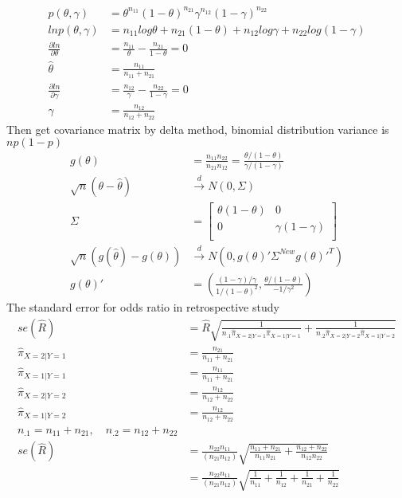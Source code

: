 	\begin{align*}
		p(\theta, \gamma) &= \theta^{n_{11}} (1-\theta)^{n_{21}} \gamma^{n_{12}} (1-\gamma)^{n_{22}}\\
		ln p(\theta, \gamma) &= n_{11}log\theta + n_{21}(1-\theta) + n_{12}log \gamma + n_{22}log(1-\gamma)\\
		\frac{\partial ln}{\partial \theta} &= \frac{n_{11}}{\theta} - \frac{n_{21}}{1-\theta} = 0\\
		\hat{\theta} &= \frac{n_{11}}{n_{11}+ n_{21}}\\
		\frac{\partial ln}{\partial \gamma} &= \frac{n_{12}}{\gamma} - \frac{n_{22}}{1-\gamma} = 0\\
		\hat{\gamma} &= \frac{n_{12}}{n_{12}+ n_{22}}
	\end{align*} 
	Then get covariance matrix by delta method, binomial distribution variance is $np(1-p)$\\
	\begin{align*}
		g(\theta) &= \frac{n_{11}n_{22}}{n_{21}n_{12}} = \frac{\theta/(1-\theta)}{\gamma/(1-\gamma)}\\
		\sqrt{n} \left( \theta - \hat{\theta} \right) & \xrightarrow[]{d} N(0, \Sigma)\\
		\Sigma &= \begin{bmatrix}
			\theta(1-\theta) &  0 \\
			0 &  \gamma(1-\gamma) \\
		\end{bmatrix}\\
		\sqrt{n} \left( g(\hat\theta) - g({\theta}) \right) & \xrightarrow[]{d} N(0, g(\theta)' \Sigma^{New} g(\theta)'^T)\\  
		g(\theta)' &= \left( \frac{(1-\gamma)/\gamma}{1/(1-\theta)^2}, \frac{\theta/(1-\theta)}{-1/\gamma^2} \right)
	\end{align*} 
	The standard error for odds ratio in retrospective study\\
	\begin{align*}
		se(\hat R) &= \hat{R} \sqrt{\frac{1}{n_{.1}\hat{\pi}_{X=2|Y=1}\hat{\pi}_{X=1|Y=1} } + \frac{1}{n_{.2}\hat{\pi}_{X=2|Y=2} \hat {\pi}_{X=1|Y=2} } }\\
		\hat{\pi}_{X=2|Y=1} &= \frac{n_{21}}{n_{11}+ n_{21}}\\
		\hat{\pi}_{X=1|Y=1} &= \frac{n_{11}}{n_{11}+ n_{21}}\\
		\hat{\pi}_{X=2|Y=2} &=  \frac{n_{12}}{n_{12} + n_{22}}\\
		\hat {\pi}_{X=1|Y=2} &= \frac{n_{12}}{n_{12} + n_{22}}\\
		n_{.1} = n_{11}+ n_{21}, \quad n_{.2}=n_{12} + n_{22}\\
		se(\hat R) &= \frac{n_{22}n_{11}}{(n_{21}n_{12})} \sqrt{\frac{n_{11}+n_{21}}{n_{11}n_{21}} + \frac{n_{12}+n_{22}}{n_{12}n_{22}} }\\
		&= \frac{{n_{22}n_{11}}}{(n_{21}n_{12})} \sqrt{\frac{1}{n_{11}} + \frac{1}{n_{12}} + \frac{1}{n_{21}} + \frac{1}{n_{22}}}\\
	\end{align*}
